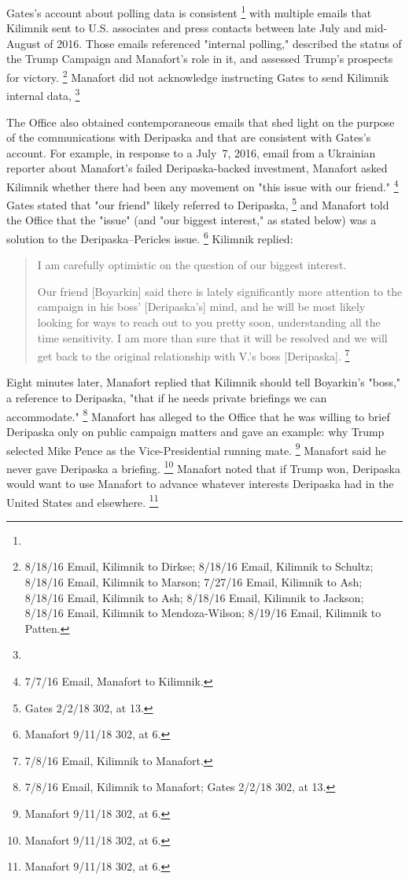 Gates's account about polling data is consistent
\footnote{}
with multiple emails that Kilimnik sent to U.S. associates and press contacts between late July and mid-August of 2016.
Those emails referenced "internal polling," described the status of the Trump Campaign and Manafort's role in it, and assessed Trump's prospects for victory.%
\footnote{8/18/16 Email, Kilimnik to Dirkse;
8/18/16 Email, Kilimnik to Schultz;
8/18/16 Email, Kilimnik to Marson;
7/27/16 Email, Kilimnik to Ash;
8/18/16 Email, Kilimnik to Ash;
8/18/16 Email, Kilimnik to Jackson;
8/18/16 Email, Kilimnik to Mendoza-Wilson;
8/19/16 Email, Kilimnik to Patten.}
Manafort did not acknowledge instructing Gates to send Kilimnik internal data,
\footnote{}

The Office also obtained contemporaneous emails that shed light on the purpose of the communications with Deripaska and that are consistent with Gates's account.
For example, in response to a July~7, 2016, email from a Ukrainian reporter about Manafort's failed Deripaska-backed investment, Manafort asked Kilimnik whether there had been any movement on "this issue with our friend."%
\footnote{7/7/16 Email, Manafort to Kilimnik.}
Gates stated that "our friend" likely referred to Deripaska,%
\footnote{Gates 2/2/18 302, at 13.}
and Manafort told the Office that the "issue" (and "our biggest interest," as stated below) was a solution to the Deripaska--Pericles issue.%
\footnote{Manafort 9/11/18 302, at 6.}
Kilimnik replied:

\begin{quote}
I am carefully optimistic on the question of our biggest interest.

Our friend [Boyarkin] said there is lately significantly more attention to the campaign in his boss' [Deripaska's] mind, and he will be most likely looking for ways to reach out to you pretty soon, understanding all the time sensitivity.
I am more than sure that it will be resolved and we will get back to the original relationship with V.'s boss [Deripaska].%
\footnote{7/8/16 Email, Kilimnik to Manafort.}
\end{quote}

Eight minutes later, Manafort replied that Kilimnik should tell Boyarkin's "boss," a reference to Deripaska, "that if he needs private briefings we can accommodate."%
\footnote{7/8/16 Email, Kilimnik to Manafort;
Gates 2/2/18 302, at 13.}
Manafort has alleged to the Office that he was willing to brief Deripaska only on public campaign matters and gave an example: why Trump selected Mike Pence as the Vice-Presidential running mate.%
\footnote{Manafort 9/11/18 302, at 6.}
Manafort said he never gave Deripaska a briefing.%
\footnote{Manafort 9/11/18 302, at 6.}
Manafort noted that if Trump won, Deripaska would want to use Manafort to advance whatever interests Deripaska had in the United States and elsewhere.%
\footnote{Manafort 9/11/18 302, at 6.}

